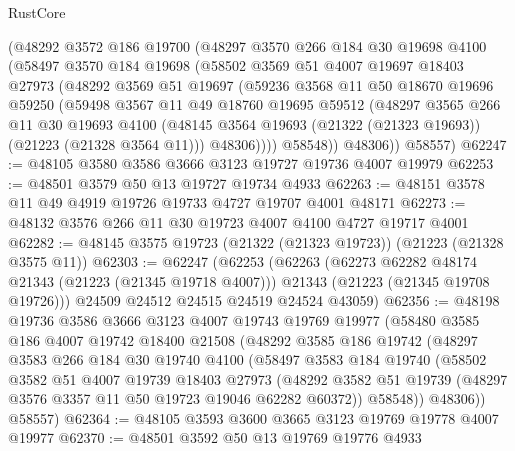 \begin{lexlean}{RustCore}
\begin{coremodule}
      (@48292
        @3572
        @186
        @19700
        (@48297
          @3570
          @266
          @184
          @30
          @19698
          @4100
          (@58497
            @3570
            @184
            @19698
            (@58502
              @3569
              @51
              @4007
              @19697
              @18403
              @27973
              (@48292
                @3569
                @51
                @19697
                (@59236
                  @3568
                  @11
                  @50
                  @18670
                  @19696
                  @59250
                  (@59498
                    @3567
                    @11
                    @49
                    @18760
                    @19695
                    @59512
                    (@48297
                      @3565
                      @266
                      @11
                      @30
                      @19693
                      @4100
                      (@48145 @3564 @19693 (@21322 (@21323 @19693)) (@21223 (@21328 @3564 @11)))
                      @48306))))
              @58548))
          @48306))
      @58557)
@62247 := @48105 @3580 @3586 @3666 @3123 @19727 @19736 @4007 @19979
@62253 := @48501 @3579 @50 @13 @19727 @19734 @4933
@62263 := @48151 @3578 @11 @49 @4919 @19726 @19733 @4727 @19707 @4001 @48171
@62273 := @48132 @3576 @266 @11 @30 @19723 @4007 @4100 @4727 @19717 @4001
@62282 := @48145 @3575 @19723 (@21322 (@21323 @19723)) (@21223 (@21328 @3575 @11))
@62303 := @62247
    (@62253
      (@62263
        (@62273 @62282 @48174 @21343 (@21223 (@21345 @19718 @4007)))
        @21343
        (@21223 (@21345 @19708 @19726)))
      @24509
      @24512
      @24515
      @24519
      @24524
      @43059)
@62356 := @48198
    @19736
    @3586
    @3666
    @3123
    @4007
    @19743
    @19769
    @19977
    (@58480
      @3585
      @186
      @4007
      @19742
      @18400
      @21508
      (@48292
        @3585
        @186
        @19742
        (@48297
          @3583
          @266
          @184
          @30
          @19740
          @4100
          (@58497
            @3583
            @184
            @19740
            (@58502
              @3582
              @51
              @4007
              @19739
              @18403
              @27973
              (@48292 @3582 @51 @19739 (@48297 @3576 @3357 @11 @50 @19723 @19046 @62282 @60372))
              @58548))
          @48306))
      @58557)
@62364 := @48105 @3593 @3600 @3665 @3123 @19769 @19778 @4007 @19977
@62370 := @48501 @3592 @50 @13 @19769 @19776 @4933

\end{coremodule}
\end{lexlean}
